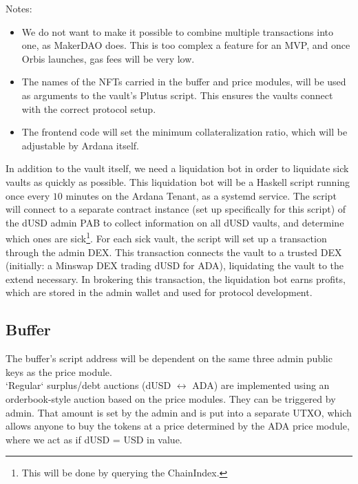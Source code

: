 \documentclass{article} %
\begin{document}
Notes:
\begin{itemize}
  \item We do not want to make it possible to combine multiple transactions into
    one, as MakerDAO does.
    This is too complex a feature for an MVP, and once Orbis launches, gas fees
    will be very low.
  \item The names of the NFTs carried in the buffer and price modules, will be
    used as arguments to the vault's Plutus script.
    This ensures the vaults connect with the correct protocol setup.
  \item The frontend code will set the minimum collateralization ratio, which
    will be adjustable by Ardana itself.
\end{itemize}

In addition to the vault itself, we need a liquidation bot in order to liquidate
sick vaults as quickly as possible.
This liquidation bot will be a Haskell script running once every $10$ minutes on
the Ardana Tenant, as a systemd service.
The script will connect to a separate contract instance (set up specifically for
this script) of the dUSD admin PAB to collect information on all dUSD vaults,
and determine which ones are sick\footnote{
  This will be done by querying the ChainIndex.
}.
For each sick vault, the script will set up a transaction through the admin DEX.
This transaction connects the vault to a trusted DEX (initially: a Minswap DEX
trading dUSD for ADA), liquidating the vault to the extend necessary.
In brokering this transaction, the liquidation bot earns profits, which are
stored in the admin wallet and used for protocol development.

\subsection{Buffer}
The buffer's script address will be dependent on the same three admin public
keys as the price module. \\

`Regular` surplus/debt auctions (dUSD $\leftrightarrow$ ADA) are implemented
using an orderbook-style auction based on the price modules.
They can be triggered by admin. That amount is set by the admin and is put 
into a separate UTXO, which allows anyone to buy the tokens at a price 
determined by the ADA price module, where we act as if dUSD = USD in value.
\end{document}
